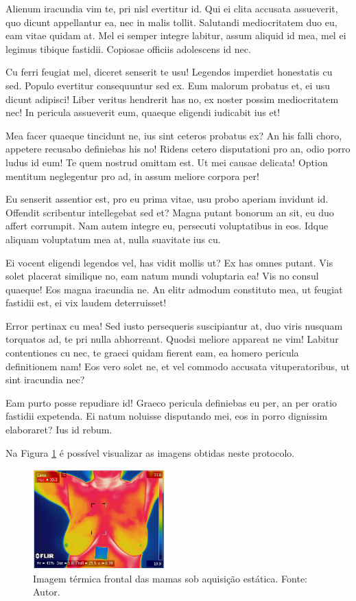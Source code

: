 \documentclass[
	12pt,				%
	openright,			%
	oneside,			%
	a4paper,			%
	english,			%
	french,				%
	spanish,			%
	brazil,				%
	]{abntex2}
\begin{document}
Alienum iracundia vim te, pri nisl evertitur id. Qui ei clita accusata assueverit, quo dicunt appellantur ea, nec in malis tollit. Salutandi mediocritatem duo eu, eam vitae quidam at. Mel ei semper integre labitur, assum aliquid id mea, mel ei legimus tibique fastidii. Copiosae officiis adolescens id nec.

Cu ferri feugiat mel, diceret senserit te usu! Legendos imperdiet honestatis cu sed. Populo evertitur consequuntur sed ex. Eum malorum probatus et, ei usu dicunt adipisci! Liber veritus hendrerit has no, ex noster possim mediocritatem nec! In pericula assueverit eum, quaeque eligendi iudicabit ius et!

Mea facer quaeque tincidunt ne, ius sint ceteros probatus ex? An his falli choro, appetere recusabo definiebas his no! Ridens cetero disputationi pro an, odio porro ludus id eum! Te quem nostrud omittam est. Ut mei causae delicata! Option mentitum neglegentur pro ad, in assum meliore corpora per!

Eu senserit assentior est, pro eu prima vitae, usu probo aperiam invidunt id. Offendit scribentur intellegebat sed et? Magna putant bonorum an sit, eu duo affert corrumpit. Nam autem integre eu, persecuti voluptatibus in eos. Idque aliquam voluptatum mea at, nulla suavitate ius cu.

Ei vocent eligendi legendos vel, has vidit mollis ut? Ex has omnes putant. Vis solet placerat similique no, eam natum mundi voluptaria ea! Vis no consul quaeque! Eos magna iracundia ne. An elitr admodum constituto mea, ut feugiat fastidii est, ei vix laudem deterruisset!

Error pertinax cu mea! Sed iusto persequeris suscipiantur at, duo viris nusquam torquatos ad, te pri nulla abhorreant. Quodsi meliore appareat ne vim! Labitur contentiones cu nec, te graeci quidam fierent eam, ea homero pericula definitionem nam! Eos vero solet ne, et vel commodo accusata vituperatoribus, ut sint iracundia nec?

Eam purto posse repudiare id! Graeco pericula definiebas eu per, an per oratio fastidii expetenda. Ei natum noluisse disputando mei, eos in porro dignissim elaboraret? Ius id rebum.

Na Figura \ref{fig: Protocolo Estatico} é possível visualizar as imagens obtidas neste protocolo.
\begin{figure}[ht]
    \centering
    \includegraphics[width=2.0in]{Images/aquisicao-estatica.png}
    \caption{Imagem térmica frontal das mamas sob aquisição estática. Fonte: Autor.}
    \label{fig: Protocolo Estatico}
\end{figure}
\end{document}
